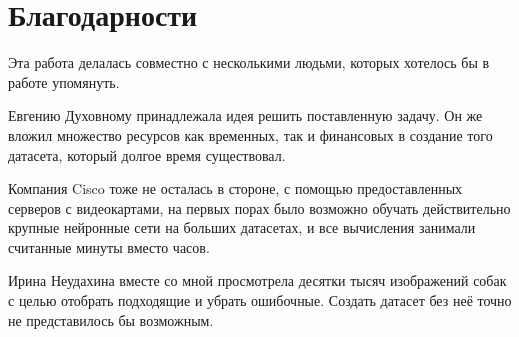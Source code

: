 \section*{Благодарности}

Эта работа делалась совместно с несколькими людьми, которых хотелось бы в работе упомянуть. 

Евгению Духовному принадлежала идея решить поставленную задачу. Он же вложил множество ресурсов как временных, так и финансовых в создание того датасета, который долгое время существовал.

Компания Cisco тоже не осталась в стороне, с помощью предоставленных серверов с видеокартами, на первых порах было возможно обучать действительно крупные нейронные сети на больших датасетах, и все вычисления занимали считанные минуты вместо часов.

Ирина Неудахина вместе со мной просмотрела десятки тысяч изображений собак с целью отобрать подходящие и убрать ошибочные. Создать датасет без неё точно не представилось бы возможным.